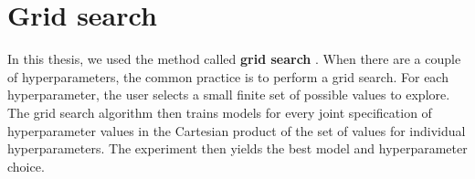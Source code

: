 \section{Grid search}
\label{section-grid-search}

In this thesis, we used the method called \textbf{grid search} \cite{grid-search}. When there are a couple of hyperparameters, the common practice
is to perform a grid search. For each hyperparameter, the user selects a
small finite set of possible values to explore. The grid search algorithm
then trains models for every joint specification of hyperparameter
values in the Cartesian product of the set of values for individual
hyperparameters. The experiment then yields the best model and hyperparameter choice. 




